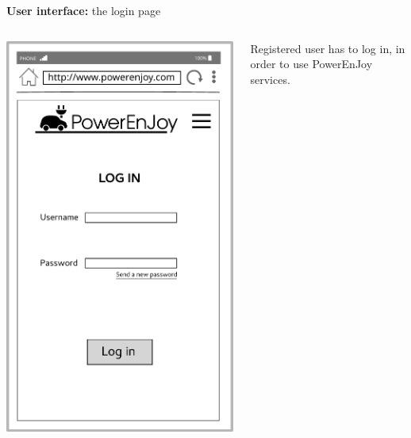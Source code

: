 \documentclass{beamer}
\begin{document}
	\begin{frame}{\textbf{User interface:} the login page}
	\begin{columns}
		\begin{column}{0.4\textwidth}
			\includegraphics[width=0.9\columnwidth]{figures/login.pdf}
		\end{column}
		\begin{column}{0.5\textwidth}
			Registered user has to log in, in order to use PowerEnJoy services.
		\end{column}
	\end{columns}
	\end{frame}	
\end{document}
